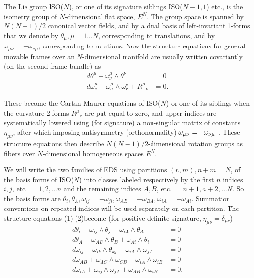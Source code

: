 \documentclass[a4paper,a4paper]{article}
\begin{document}
        The Lie group ISO($N$),  or one of its signature siblings
ISO($N-1, 1$) etc.,  is the isometry group of $N$-dimensional flat space,
${E^N}$.  The group space is spanned by $N(N + 1)/2$ canonical vector fields,  and by a dual
basis of  left-invariant 1-forms that we denote by  ${{\theta }_{\mu }}, 
\mu = 1...N$,   corresponding to translations,  and by  ${{\omega
}_{{\mu \nu }}} = - {{\omega }_{{\nu \mu }}}$,   corresponding to rotations.  Now the structure equations for
general movable frames over an $N$-dimensional manifold are usually written
covariantly (on the second frame bundle) as
\begin{align}
{d\theta }^{\mu }+{\omega }^{\mu }_{\nu } \wedge {\theta }^{\nu } &= 0 \\
{d\omega }^{\mu }_{\nu }+{\omega }^{\mu }_{\sigma }\wedge {\omega
}^{\sigma }_{\nu }+{R^{\mu }}_{\nu
} &= 0.
\end{align}

These become the Cartan-Maurer equations of ISO($N$) or one of its
siblings when the curvature 2-forms \({{{R^{\mu }}}_{\nu }}\) are put
equal to zero, and upper indices are systematically lowered using (for signature) a
non-singular matrix of constants  \({{\eta }_{{\mu \nu }}}\),  after
which imposing antisymmetry (orthonormality)  ${{\omega }_{{\mu \nu
}}}\) = -  \({{\omega }_{{\nu \mu }}}$ .  These structure
equations then describe $N(N-1)/2$-dimensional rotation groups as fibers
over $N$-dimensional homogeneous spaces $E^N$.

 We will write the two families of EDS using partitions $(n,
m),  n + m = N$, of the basis forms of ISO($N$) into classes labeled
respectively by the first $n$ indices $i,  j$,  etc. $= 1,  2,  ... n$ and the
remaining indices $A,  B$,  etc. $= n +1,  n +2,  ... N$.  So the basis
forms are ${{\theta }_i},  {{\theta }_A},  {{\omega }_{{ij}}} = - {{\omega
}_{{ji}}},  {{\omega }_{{AB}}} = - {{\omega
}_{{BA}}},  {{\omega }_{{iA}}} =-{{\omega }_{{Ai}}}$.  Summation
conventions on repeated indices will be used separately on each partition.  
The structure equations (1) (2)become (for positive definite signature, 
${{\eta }_{{\mu \nu }}} = {{\delta }_{{\mu \nu }}}$)
\begin{align}
{d\theta }_{i}+{\omega }_{ij} \wedge {\theta }_{j} + {\omega }_{iA}
\wedge {\theta }_{A} &=0 \\
{d\theta }_{A}+{\omega }_{AB} \wedge {\theta }_{B} + {\omega }_{Ai}
\wedge {\theta }_{i} &=0 \\
{d\omega }_{ij}+{\omega }_{ik} \wedge {\theta }_{kj} - {\omega }_{iA}
\wedge
{\omega }_{jA} &= 0  \\
{d\omega }_{AB} +{\omega }_{AC} \wedge {\omega }_{CB} - {\omega }_{iA}
\wedge
{\omega }_{iB} &= 0  \\
{d\omega }_{iA} +{\omega }_{ij} \wedge {\omega }_{jA} + {\omega }_{AB}
\wedge
{\omega }_{iB} &= 0.
\end{align}
\end{document}
